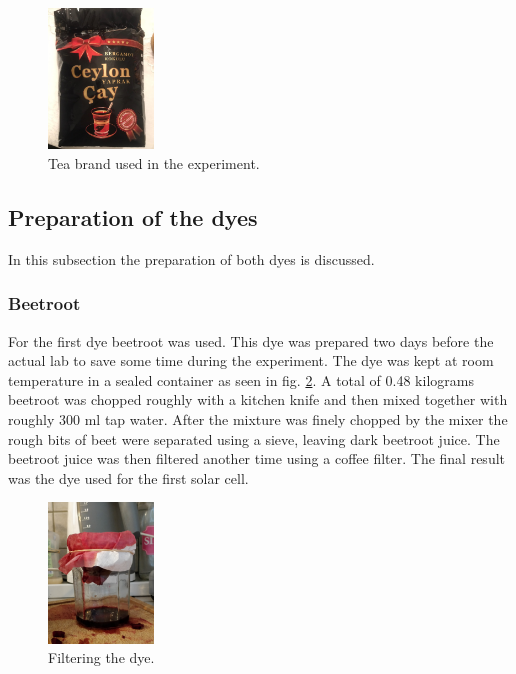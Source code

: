 \documentclass[conference]{IEEEtran}
\begin{document}
\begin{figure}[h]
\centering
\includegraphics[width=0.25\textwidth]{cay.png}
\caption{Tea brand used in the experiment.}
\label{fig:cay} %
\end{figure}

\subsection{Preparation of the dyes}
In this subsection the preparation of both dyes is discussed.\\
\subsubsection{Beetroot}
For the first dye beetroot was used. This dye was prepared two days before the actual lab to save some time during the experiment. The dye was kept at room temperature in a sealed container as seen in fig. \ref{fig:dyepreparationbeet}. A total of 0.48 kilograms beetroot was chopped roughly with a kitchen knife and then mixed together with roughly 300 ml tap water. After the mixture was finely chopped by the mixer the rough bits of beet were separated using a sieve, leaving dark beetroot juice. The beetroot juice was then filtered another time using a coffee filter. The final result was the dye used for the first solar cell.

\begin{figure}[h]
\centering
\includegraphics[width=0.25\textwidth]{DyePreparationBeet.jpg}
\caption{Filtering the dye.}
\label{fig:dyepreparationbeet} %
\end{figure}
\end{document}
